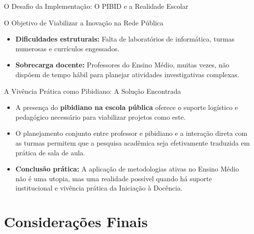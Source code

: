 \documentclass[10pt]{beamer}
\begin{document}
\begin{frame}{O Desafio da Implementação: O PIBID e a Realidade Escolar}
\transdissolve
\begin{block}{O Objetivo de Viabilizar a Inovação na Rede Pública}
\scriptsize
\begin{itemize}
    \setlength{\itemsep}{0pt}
    \item \textbf{Dificuldades estruturais:} Falta de laboratórios de informática, turmas numerosas e currículos engessados.
    \item \textbf{Sobrecarga docente:} Professores do Ensino Médio, muitas vezes, não dispõem de tempo hábil para planejar atividades investigativas complexas.
\end{itemize}
\end{block}
\vspace{0.1cm}
\begin{alertblock}{A Vivência Prática como Pibidiano: A Solução Encontrada}
\scriptsize
\begin{itemize}
    \setlength{\itemsep}{0pt}
    \item A presença do \textbf{pibidiano na escola pública} oferece o suporte logístico e pedagógico necessário para viabilizar projetos como este.
    \item O planejamento conjunto entre professor e pibidiano e a interação direta com as turmas permitem que a pesquisa acadêmica seja efetivamente traduzida em prática de sala de aula.
    \item \textbf{Conclusão prática:} A aplicação de metodologias ativas no Ensino Médio não é uma utopia, mas uma realidade possível quando há suporte institucional e vivência prática da Iniciação à Docência.
\end{itemize}
\end{alertblock}
\end{frame}

\section{Considera\c{c}\~{o}es Finais}
\end{document}
